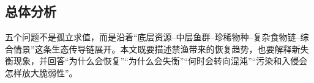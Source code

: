\subsection{总体分析}
五个问题不是孤立求值，而是沿着“底层资源--中层鱼群--珍稀物种--复杂食物链--综合情景”这条生态传导链展开。本文既要描述禁渔带来的恢复趋势，也要解释新失衡现象，并回答“为什么会恢复”“为什么会失衡”“何时会转向混沌”“污染和入侵会怎样放大脆弱性”。
